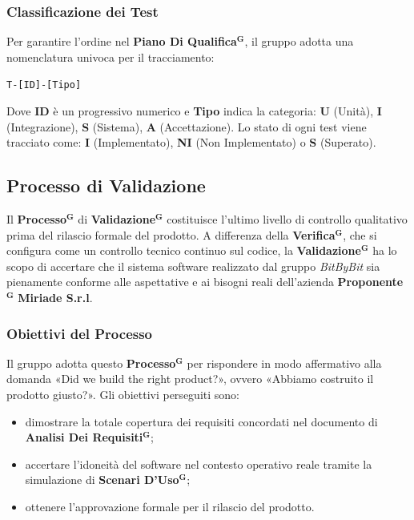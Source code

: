 \documentclass[a4paper,12pt]{article}
\newcommand{\term}[1]{\textbf{#1}$^\mathbf{G}$}
\begin{document}
\subsubsection{Classificazione dei Test}
Per garantire l'ordine nel \textbf{\term{Piano Di Qualifica}}, il gruppo adotta una nomenclatura univoca per il tracciamento:
\begin{center}
    \texttt{T-[ID]-[Tipo]}
\end{center}
Dove \textbf{ID} è un progressivo numerico e \textbf{Tipo} indica la categoria: \textbf{U} (Unità), \textbf{I} (Integrazione), \textbf{S} (Sistema), \textbf{A} (Accettazione).
Lo stato di ogni test viene tracciato come: \textbf{I} (Implementato), \textbf{NI} (Non Implementato) o \textbf{S} (Superato).

\subsection{Processo di Validazione}
Il \term{Processo} di \term{Validazione} costituisce l'ultimo livello di controllo qualitativo prima del rilascio formale del prodotto.
A differenza della \term{Verifica}, che si configura come un controllo tecnico continuo sul codice, la \term{Validazione} ha lo scopo di accertare che il sistema software realizzato dal gruppo \textit{BitByBit} sia pienamente conforme alle aspettative e ai bisogni reali dell'azienda \term{Proponente} \textbf{Miriade S.r.l}.

\subsubsection{Obiettivi del Processo}
Il gruppo adotta questo \term{Processo} per rispondere in modo affermativo alla domanda «Did we build the right product?», ovvero «Abbiamo costruito il prodotto giusto?».
Gli obiettivi perseguiti sono:
\begin{itemize}
    \item dimostrare la totale copertura dei requisiti concordati nel documento di \textbf{\term{Analisi Dei Requisiti}};
    \item accertare l'idoneità del software nel contesto operativo reale tramite la simulazione di \term{Scenari D'Uso};
    \item ottenere l'approvazione formale per il rilascio del prodotto.
\end{itemize}
\end{document}
